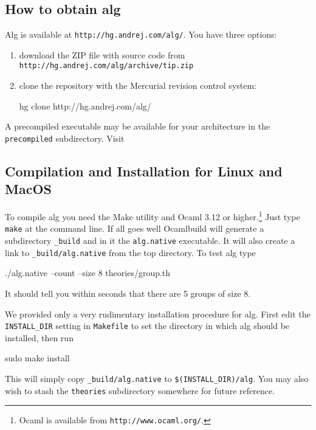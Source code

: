 \documentclass{article}
\begin{document}
\subsection{How to obtain alg}
\label{sec:how-obtain-alg}

Alg is available at \texttt{http://hg.andrej.com/alg/}. You have three
options:
%
\begin{enumerate}
\item download the ZIP file with source code from
  \texttt{http://hg.andrej.com/alg/archive/tip.zip}
\item clone the repository with the Mercurial revision control system:
%
\begin{shell}
hg clone http://hg.andrej.com/alg/
\end{shell}

\end{enumerate}

%
A precompiled executable may be available for your architecture in the
\texttt{precompiled} subdirectory. Visit



\subsection{Compilation and Installation for Linux and MacOS}
\label{sec:comp-under-linux}

To compile alg you need the Make utility and Ocaml 3.12 or
higher.\footnote{Ocaml is available from \texttt{http://www.ocaml.org/}.}
Just type \texttt{make} at the command line. If all goes well
Ocamlbuild will generate a subdirectory \texttt{_build} and in it the
\texttt{alg.native} executable. It will also create a link to
\texttt{_build/alg.native} from the top directory. To test alg type
%
\begin{shell}
./alg.native --count --size 8 theories/group.th
\end{shell}
%
It should tell you within seconds that there are 5 groups of size 8. 

We provided only a very rudimentary installation procedure for alg.
First edit the \texttt{INSTALL\_DIR} setting in \texttt{Makefile} to
set the directory in which alg should be installed, then run
%
\begin{shell}
sudo make install
\end{shell}
%
This will simply copy \texttt{_build/alg.native} to
\texttt{\$(INSTALL\_DIR)/alg}. You may also wish to stash the
\texttt{theories} subdirectory somewhere for future reference.
\end{document}
